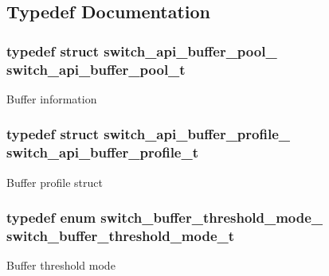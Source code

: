 \subsection{Typedef Documentation}
\hypertarget{group__Buffer_ga1302c4962b38d77d99766608e5cb4ccd}{
\subsubsection[{switch\+\_\+api\+\_\+buffer\+\_\+pool\+\_\+t}]{\setlength{\rightskip}{0pt plus 5cm}typedef struct {\bf switch\+\_\+api\+\_\+buffer\+\_\+pool\+\_\+}  {\bf switch\+\_\+api\+\_\+buffer\+\_\+pool\+\_\+t}}}\label{group__Buffer_ga1302c4962b38d77d99766608e5cb4ccd}
Buffer information \hypertarget{group__Buffer_ga4d903bc1adf700cb1f2c3313c953e059}{
\subsubsection[{switch\+\_\+api\+\_\+buffer\+\_\+profile\+\_\+t}]{\setlength{\rightskip}{0pt plus 5cm}typedef struct {\bf switch\+\_\+api\+\_\+buffer\+\_\+profile\+\_\+}  {\bf switch\+\_\+api\+\_\+buffer\+\_\+profile\+\_\+t}}}\label{group__Buffer_ga4d903bc1adf700cb1f2c3313c953e059}
Buffer profile struct \hypertarget{group__Buffer_gad5d808c4c42a170d1afae11767fddeff}{
\subsubsection[{switch\+\_\+buffer\+\_\+threshold\+\_\+mode\+\_\+t}]{\setlength{\rightskip}{0pt plus 5cm}typedef enum {\bf switch\+\_\+buffer\+\_\+threshold\+\_\+mode\+\_\+}  {\bf switch\+\_\+buffer\+\_\+threshold\+\_\+mode\+\_\+t}}}\label{group__Buffer_gad5d808c4c42a170d1afae11767fddeff}
Buffer threshold mode 

